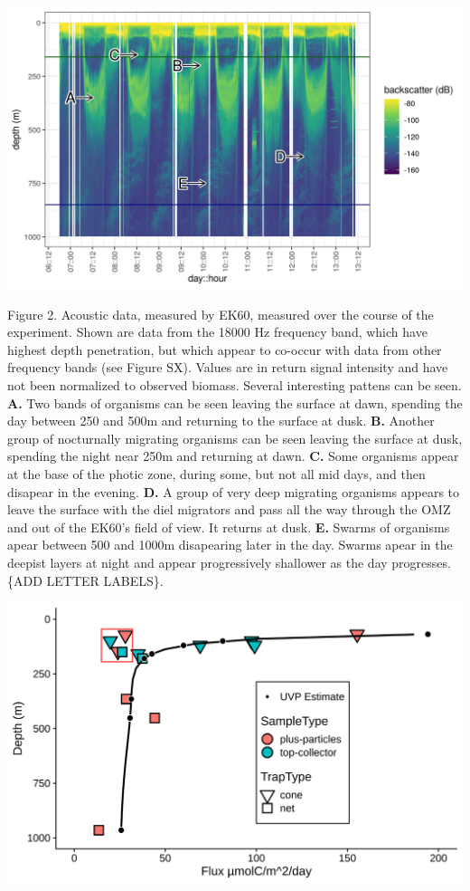 \documentclass[]{article}
\begin{document}
\includegraphics{../figures/stationP2_EK60_18kOnly.png}

Figure 2. Acoustic data, measured by EK60, measured over the course of
the experiment. Shown are data from the 18000 Hz frequency band, which
have highest depth penetration, but which appear to co-occur with data
from other frequency bands (see Figure SX). Values are in return signal
intensity and have not been normalized to observed biomass. Several
interesting pattens can be seen. \textbf{A.} Two bands of organisms can
be seen leaving the surface at dawn, spending the day between 250 and
500m and returning to the surface at dusk. \textbf{B.} Another group of
nocturnally migrating organisms can be seen leaving the surface at dusk,
spending the night near 250m and returning at dawn. \textbf{C.} Some
organisms appear at the base of the photic zone, during some, but not
all mid days, and then disapear in the evening. \textbf{D.} A group of
very deep migrating organisms appears to leave the surface with the diel
migrators and pass all the way through the OMZ and out of the EK60's
field of view. It returns at dusk. \textbf{E.} Swarms of organisms apear
between 500 and 1000m disapearing later in the day. Swarms apear in the
deepist layers at night and appear progressively shallower as the day
progresses. \{ADD LETTER LABELS\}.

\includegraphics{../figures/FittedFlux.svg}
\end{document}
